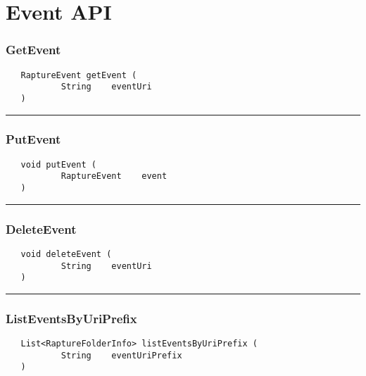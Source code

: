 \chapter{Event API}

\subsection{GetEvent}
\label{Api:GetEvent}
\begin{verbatim}
   RaptureEvent getEvent (
           String    eventUri
   )
\end{verbatim}



\rule{15cm}{2pt}
\subsection{PutEvent}
\label{Api:PutEvent}
\begin{verbatim}
   void putEvent (
           RaptureEvent    event
   )
\end{verbatim}



\rule{15cm}{2pt}
\subsection{DeleteEvent}
\label{Api:DeleteEvent}
\begin{verbatim}
   void deleteEvent (
           String    eventUri
   )
\end{verbatim}



\rule{15cm}{2pt}
\subsection{ListEventsByUriPrefix}
\label{Api:ListEventsByUriPrefix}
\begin{verbatim}
   List<RaptureFolderInfo> listEventsByUriPrefix (
           String    eventUriPrefix
   )
\end{verbatim}



